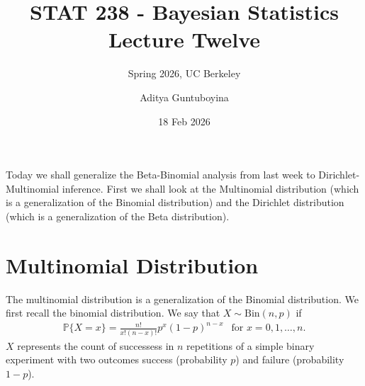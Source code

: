 \documentclass{scrartcl}
\renewcommand{\P}{{\mathbb P}}
\begin{document}
\title{STAT 238 - Bayesian Statistics  \\
  Lecture Twelve} 
\subtitle{Spring 2026, UC Berkeley}

\author{Aditya Guntuboyina}


\date{18 Feb 2026}

\maketitle

Today we shall generalize the Beta-Binomial analysis from last week to
Dirichlet-Multinomial inference. First we shall look at the
Multinomial distribution (which is a generalization of the Binomial
distribution) and the Dirichlet distribution (which is a
generalization of the Beta distribution).

\section{Multinomial Distribution}

The multinomial distribution is a generalization of the Binomial
distribution. We first recall the binomial distribution. We say that
$X \sim \text{Bin}(n, p)$ if
\begin{align*}
   \P\{X = x\} = \frac{n!}{x! (n-x)!} p^x (1 - p)^{n-x} ~~ \text{ for
  } x = 0, 1, \dots, n. 
\end{align*}
$X$ represents the count of successess in $n$ repetitions of a simple
binary experiment with two outcomes success (probability $p$) and
failure (probability $1 - p$).
\end{document}
